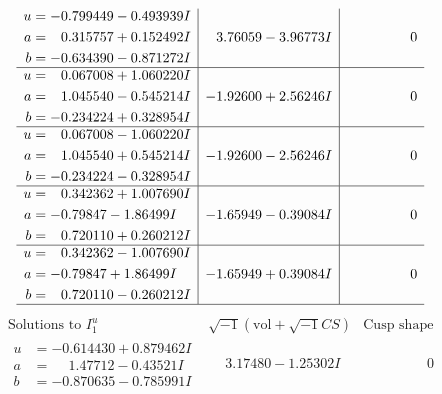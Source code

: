 \documentclass[1p]{elsarticle_modified}
\theoremstyle{definition}
\newcommand{\I}{\sqrt{-1}}
\begin{document}
$$\begin{array}{c|c|c}
\begin{aligned}
u &= -0.799449 - 0.493939 I \\
a &= \phantom{-}0.315757 + 0.152492 I \\
b &= -0.634390 - 0.871272 I\end{aligned}
 & \phantom{-}3.76059 - 3.96773 I & \phantom{-0.000000 } 0 \\ \hline\begin{aligned}
u &= \phantom{-}0.067008 + 1.060220 I \\
a &= \phantom{-}1.045540 - 0.545214 I \\
b &= -0.234224 + 0.328954 I\end{aligned}
 & -1.92600 + 2.56246 I & \phantom{-0.000000 } 0 \\ \hline\begin{aligned}
u &= \phantom{-}0.067008 - 1.060220 I \\
a &= \phantom{-}1.045540 + 0.545214 I \\
b &= -0.234224 - 0.328954 I\end{aligned}
 & -1.92600 - 2.56246 I & \phantom{-0.000000 } 0 \\ \hline\begin{aligned}
u &= \phantom{-}0.342362 + 1.007690 I \\
a &= -0.79847 - 1.86499 I \\
b &= \phantom{-}0.720110 + 0.260212 I\end{aligned}
 & -1.65949 - 0.39084 I & \phantom{-0.000000 } 0 \\ \hline\begin{aligned}
u &= \phantom{-}0.342362 - 1.007690 I \\
a &= -0.79847 + 1.86499 I \\
b &= \phantom{-}0.720110 - 0.260212 I\end{aligned}
 & -1.65949 + 0.39084 I & \phantom{-0.000000 } 0\\
 \hline 
 \end{array}$$\newpage$$\begin{array}{c|c|c}  
\text{Solutions to }I^u_{1}& \I (\text{vol} + \sqrt{-1}CS) & \text{Cusp shape}\\
 \hline 
\begin{aligned}
u &= -0.614430 + 0.879462 I \\
a &= \phantom{-}1.47712 - 0.43521 I \\
b &= -0.870635 - 0.785991 I\end{aligned}
 & \phantom{-}3.17480 - 1.25302 I & \phantom{-0.000000 } 0 \\ \hline\begin{aligned}

\end{aligned}
\end{array}$$
\end{document}
